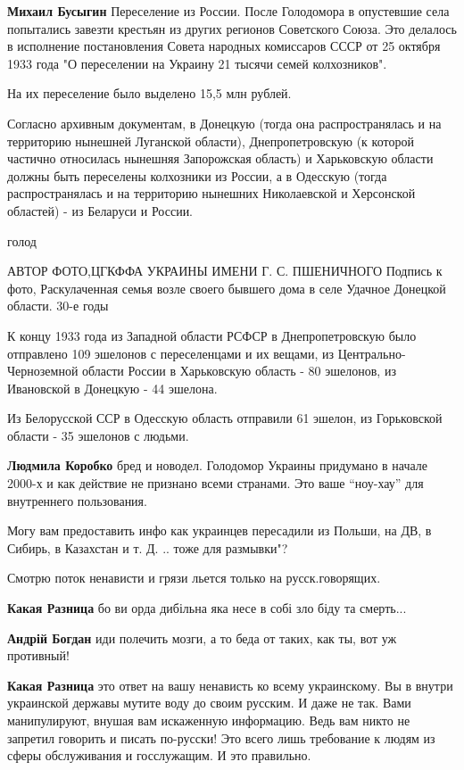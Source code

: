 \begin{itemize}
\begin{itemize}
\textbf{Михаил Бусыгин} Переселение из России.
После Голодомора в опустевшие села попытались завезти крестьян из других
регионов Советского Союза. Это делалось в исполнение постановления Совета
народных комиссаров СССР от 25 октября 1933 года "О переселении на Украину 21
тысячи семей колхозников".

На их переселение было выделено 15,5 млн рублей.

Согласно архивным документам, в Донецкую (тогда она распространялась и на
территорию нынешней Луганской области), Днепропетровскую (к которой частично
относилась нынешняя Запорожская область) и Харьковскую области должны быть
переселены колхозники из России, а в Одесскую (тогда распространялась и на
территорию нынешних Николаевской и Херсонской областей) - из Беларуси и России.

голод

АВТОР ФОТО,ЦГКФФА УКРАИНЫ ИМЕНИ Г. С. ПШЕНИЧНОГО
Подпись к фото,
Раскулаченная семья возле своего бывшего дома в селе Удачное Донецкой области. 30-е годы

К концу 1933 года из Западной области РСФСР в Днепропетровскую было отправлено
109 эшелонов с переселенцами и их вещами, из Центрально-Черноземной области
России в Харьковскую область - 80 эшелонов, из Ивановской в Донецкую - 44
эшелона.

Из Белорусской ССР в Одесскую область отправили 61 эшелон, из Горьковской
области - 35 эшелонов с людьми.


\textbf{Людмила Коробко} бред и новодел. Голодомор Украины придумано в начале
2000-х и как действие не признано всеми странами. Это ваше \enquote{ноу-хау} для
внутреннего пользования.

Могу вам предоставить инфо как украинцев пересадили из Польши, на ДВ, в Сибирь,
в Казахстан и т. Д. .. тоже для размывки"?

\end{itemize}

Смотрю поток ненависти и грязи льется только на русск.говорящих.

\begin{itemize}

\textbf{Какая Разница} бо ви орда дибільна яка несе в собі зло біду та смерть...

\textbf{Андрій Богдан} иди полечить мозги, а то беда от таких, как ты, вот уж противный!

\textbf{Какая Разница} это ответ на вашу ненависть ко всему украинскому. Вы в
внутри украинской державы мутите воду до своим русским. И даже не так. Вами
манипулируют, внушая вам искаженную информацию. Ведь вам никто не запретил
говорить и писать по-русски! Это всего лишь требование к людям из сферы
обслуживания и госслужащим. И это правильно.


\end{itemize}
\end{itemize}
